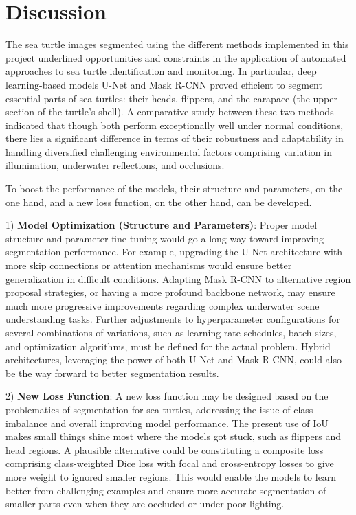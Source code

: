 \documentclass[conference]{IEEEtran}
\begin{document}
\section{Discussion}
The sea turtle images segmented using the different methods implemented in this project underlined opportunities and constraints in the application of automated approaches to sea turtle identification and monitoring. In particular, deep learning-based models U-Net and Mask R-CNN proved efficient to segment essential parts of sea turtles: their heads, flippers, and the carapace (the upper section of the turtle's shell). A comparative study between these two methods indicated that though both perform exceptionally well under normal conditions, there lies a significant difference in terms of their robustness and adaptability in handling diversified challenging environmental factors comprising variation in illumination, underwater reflections, and occlusions.

To boost the performance of the models, their structure and parameters, on the one hand, and a new loss function, on the other hand, can be developed.

1) \textbf{Model Optimization (Structure and Parameters)}: Proper model structure and parameter fine-tuning would go a long way toward improving segmentation performance. For example, upgrading the U-Net architecture with more skip connections or attention mechanisms would ensure better generalization in difficult conditions. Adapting Mask R-CNN to alternative region proposal strategies, or having a more profound backbone network, may ensure much more progressive improvements regarding complex underwater scene understanding tasks. Further adjustments to hyperparameter configurations for several combinations of variations, such as learning rate schedules, batch sizes, and optimization algorithms, must be defined for the actual problem. Hybrid architectures, leveraging the power of both U-Net and Mask R-CNN, could also be the way forward to better segmentation results.

2) \textbf{New Loss Function}: A new loss function may be designed based on the problematics of segmentation for sea turtles, addressing the issue of class imbalance and overall improving model performance. The present use of IoU makes small things shine most where the models got stuck, such as flippers and head regions. A plausible alternative could be constituting a composite loss comprising class-weighted Dice loss with focal and cross-entropy losses to give more weight to ignored smaller regions. This would enable the models to learn better from challenging examples and ensure more accurate segmentation of smaller parts even when they are occluded or under poor lighting.
\end{document}
